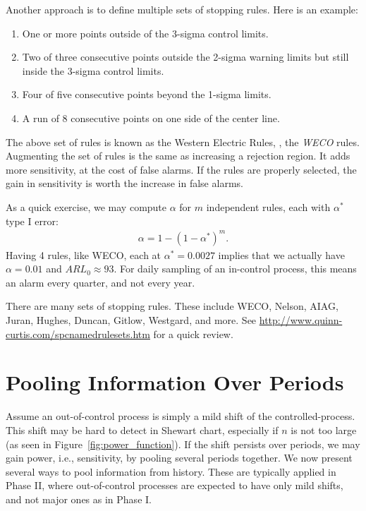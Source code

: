 Another approach is to define multiple sets of stopping rules.
Here is an example:
\begin{enumerate}
\item One or more points outside of the 3-sigma control limits.
\item Two of three consecutive points outside the 2-sigma warning limits but still inside the 3-sigma control limits.
\item Four of five consecutive points beyond the 1-sigma limits.
\item A run of 8 consecutive points on one side of the center line.
\end{enumerate}
The above set of rules is known as the Western Electric Rules, \aka, the \emph{WECO} rules.
Augmenting the set of rules is the same as increasing a rejection region. It adds more sensitivity, at the cost of false alarms. If the rules are properly selected, the gain in sensitivity is worth the increase in false alarms.

As a quick exercise, we may compute $\alpha$  for $m$ independent rules, each with $\alpha^*$ type I error:
\begin{align}
\label{eq:multiplicity_in_spc}
	\alpha=1-(1-\alpha^*)^m.
\end{align}
Having 4 rules, like WECO, each at $\alpha^*=0.0027$ implies that we actually have $\alpha=0.01$ and $ARL_0 \approx 93$. For daily sampling of an in-control process, this means an alarm every quarter, and not every year. 

\begin{extra}
There are many sets of stopping rules. 
These include WECO, Nelson, AIAG, Juran, Hughes, Duncan, Gitlow, Westgard, and more. 
See \url{http://www.quinn-curtis.com/spcnamedrulesets.htm} for a quick review.
\end{extra}






\section{Pooling Information Over Periods}
\label{sec:running_windows}

Assume an out-of-control process is simply a mild shift of the controlled-process.
This shift may be hard to detect in Shewart chart, especially if $n$ is not too large (as seen in Figure~\ref{fig:power_function}).  
If the shift persists over periods, we may gain power, i.e., sensitivity, by pooling several periods together. 
We now present several ways to pool information from history. These are typically applied in Phase II, where out-of-control processes are expected to have only mild shifts, and not major ones as in Phase I. 

